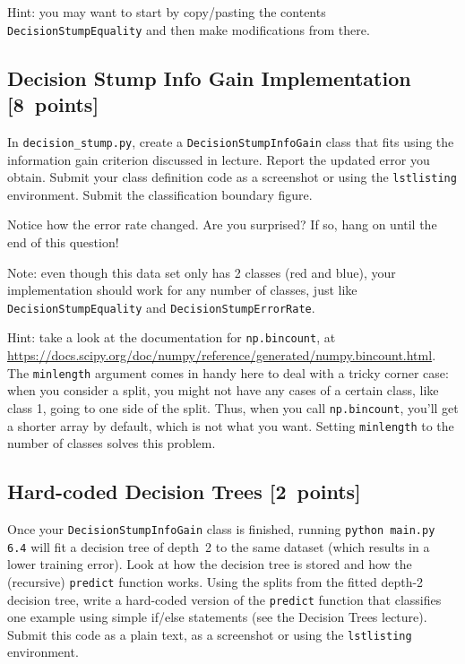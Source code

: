 \documentclass{article}
\newcommand{\blu}[1]{{\textcolor{blu}{#1}}}
\let\ask\blu
\newcommand\pts[1]{\textcolor{pointscolour}{[#1~points]}}
\begin{document}
  Hint: you may want to start by copy/pasting the contents \texttt{DecisionStumpEquality} and then make modifications from there. %

  



  \subsection{Decision Stump Info Gain Implementation \pts{8}}

  In \texttt{decision\string_stump.py}, \ask{create a \texttt{DecisionStumpInfoGain} class that
  fits using the information gain criterion discussed in lecture.
  Report the updated error you obtain.
  Submit your class definition code as a screenshot or using the \texttt{lstlisting} environment.
  Submit the classification boundary figure.}

  Notice how the error rate changed. Are you surprised? If so, hang on until the end of this question!

  Note: even though this data set only has 2 classes (red and blue), your implementation should work
  for any number of classes, just like \texttt{DecisionStumpEquality} and \texttt{DecisionStumpErrorRate}.

  Hint: take a look at the documentation for \texttt{np.bincount}, at \\
  \url{https://docs.scipy.org/doc/numpy/reference/generated/numpy.bincount.html}.
  The \texttt{minlength} argument comes in handy here to deal with a tricky corner case:
  when you consider a split, you might not have any cases of a certain class, like class 1,
  going to one side of the split. Thus, when you call \texttt{np.bincount}, you'll get
  a shorter array by default, which is not what you want. Setting \texttt{minlength} to the
  number of classes solves this problem.


  


  \subsection{Hard-coded Decision Trees \pts{2}}

  Once your \texttt{DecisionStumpInfoGain} class is finished, running \texttt{python main.py 6.4} will fit
  a decision tree of depth~2 to the same dataset (which results in a lower training error).
  Look at how the decision tree is stored and how the (recursive) \texttt{predict} function works.
  \ask{Using the splits from the fitted depth-2 decision tree, write a hard-coded version of the \texttt{predict}
  function that classifies one example using simple if/else statements
  (see the Decision Trees lecture). Submit this code as a plain text, as a screenshot or using the \texttt{lstlisting} environment.}
\end{document}
